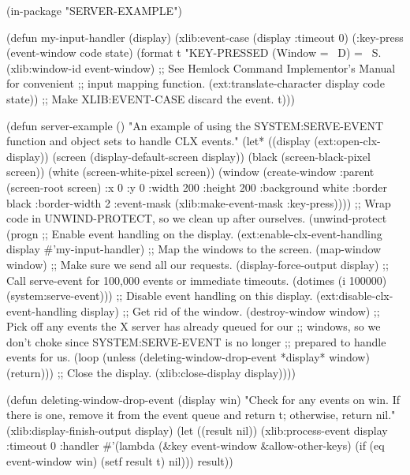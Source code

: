 {\begin{lisp}
(in-package "SERVER-EXAMPLE")

(defun my-input-handler (display)
  (xlib:event-case (display :timeout 0)
    (:key-press (event-window code state)
     (format t "KEY-PRESSED (Window = ~D) = ~S.~%
                  (xlib:window-id event-window)
             ;; See Hemlock Command Implementor's Manual for convenient
             ;; input mapping function.
             (ext:translate-character display code state))
      ;; Make XLIB:EVENT-CASE discard the event.
      t)))
\end{lisp}
\begin{lisp}
(defun server-example ()
  "An example of using the SYSTEM:SERVE-EVENT function and object sets to
   handle CLX events."
  (let* ((display (ext:open-clx-display))
         (screen (display-default-screen display))
         (black (screen-black-pixel screen))
         (white (screen-white-pixel screen))
         (window (create-window :parent (screen-root screen)
                                :x 0 :y 0 :width 200 :height 200
                                :background white :border black
                                :border-width 2
                                :event-mask
                                (xlib:make-event-mask :key-press))))
    ;; Wrap code in UNWIND-PROTECT, so we clean up after ourselves.
    (unwind-protect
        (progn
          ;; Enable event handling on the display.
          (ext:enable-clx-event-handling display #'my-input-handler)
          ;; Map the windows to the screen.
          (map-window window)
          ;; Make sure we send all our requests.
          (display-force-output display)
          ;; Call serve-event for 100,000 events or immediate timeouts.
          (dotimes (i 100000) (system:serve-event)))
      ;; Disable event handling on this display.
      (ext:disable-clx-event-handling display)
      ;; Get rid of the window.
      (destroy-window window)
      ;; Pick off any events the X server has already queued for our
      ;; windows, so we don't choke since SYSTEM:SERVE-EVENT is no longer
      ;; prepared to handle events for us.
      (loop
       (unless (deleting-window-drop-event *display* window)
        (return)))
      ;; Close the display.
      (xlib:close-display display))))

(defun deleting-window-drop-event (display win)
  "Check for any events on win.  If there is one, remove it from the
   event queue and return t; otherwise, return nil."
  (xlib:display-finish-output display)
  (let ((result nil))
    (xlib:process-event
     display :timeout 0
     :handler #'(lambda (&key event-window &allow-other-keys)
                  (if (eq event-window win)
                      (setf result t)
                      nil)))
    result))
\end{lisp}


}
